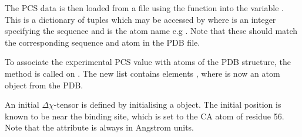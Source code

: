 \documentclass[a4paper,10pt,english]{sphinxmanual}
\begin{document}
The PCS data is then loaded from a  file using the function {\hyperref[\detokenize{reference/generated/paramagpy.dataparse.read_pcs:paramagpy.dataparse.read_pcs}]{}} into the variable . This is a dictionary of  tuples which may be accessed by  where  is an integer specifying the sequence and  is the atom name e.g . Note that these should match the corresponding sequence and atom in the PDB file.

%
\begin{sphinxVerbatim}[commandchars=\\\{\}]
  
\end{sphinxVerbatim}

To associate the experimental PCS value with atoms of the PDB structure, the method {\hyperref[\detokenize{reference/generated/paramagpy.protein.CustomStructure.parse:paramagpy.protein.CustomStructure.parse}]{}} is called on . The new list  contains elements , where  is now an atom object from the PDB.

%
\begin{sphinxVerbatim}[commandchars=\\\{\}]
  
\end{sphinxVerbatim}

An initial \({\Delta\chi}\)-tensor is defined by initialising a {\hyperref[\detokenize{reference/generated/paramagpy.metal.Metal:paramagpy.metal.Metal}]{}} object. The initial position is known to be near the binding site, which is set to the CA atom of residue 56. Note that the  attribute is always in Angstrom units.
\end{document}
